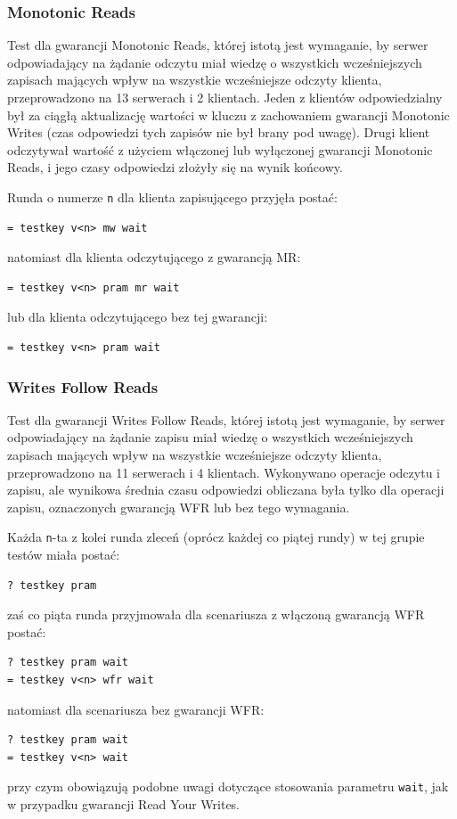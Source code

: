 \subsubsection*{Monotonic Reads}

Test dla gwarancji Monotonic Reads, której istotą jest wymaganie, by serwer odpowiadający na żądanie odczytu miał wiedzę o wszystkich wcześniejszych zapisach mających wpływ na wszystkie wcześniejsze odczyty klienta, przeprowadzono na 13 serwerach i 2 klientach. Jeden z klientów odpowiedzialny był za ciągłą aktualizację wartości w kluczu z zachowaniem gwarancji Monotonic Writes (czas odpowiedzi tych zapisów nie był brany pod uwagę). Drugi klient odczytywał wartość z użyciem włączonej lub wyłączonej gwarancji Monotonic Reads, i jego czasy odpowiedzi złożyły się na wynik końcowy.

Runda o numerze \texttt{n} dla klienta zapisującego przyjęła postać:
\begin{lstlisting}
= testkey v<n> mw wait
\end{lstlisting}
natomiast dla klienta odczytującego z gwarancją MR:
\begin{lstlisting}
= testkey v<n> pram mr wait
\end{lstlisting}
lub dla klienta odczytującego bez tej gwarancji:
\begin{lstlisting}
= testkey v<n> pram wait
\end{lstlisting}

\subsubsection*{Writes Follow Reads}

Test dla gwarancji Writes Follow Reads, której istotą jest wymaganie, by serwer odpowiadający na żądanie zapisu miał wiedzę o wszystkich wcześniejszych zapisach mających wpływ na wszystkie wcześniejsze odczyty klienta, przeprowadzono na 11 serwerach i 4 klientach. Wykonywano operacje odczytu i zapisu, ale wynikowa średnia czasu odpowiedzi obliczana była tylko dla operacji zapisu, oznaczonych gwarancją WFR lub bez tego wymagania.

Każda \texttt{n}-ta z kolei runda zleceń (oprócz każdej co piątej rundy) w tej grupie testów miała postać:
\begin{lstlisting}
? testkey pram
\end{lstlisting}
zaś co piąta runda przyjmowała dla scenariusza z włączoną gwarancją WFR postać:
\begin{lstlisting}
? testkey pram wait
= testkey v<n> wfr wait
\end{lstlisting}
natomiast dla scenariusza bez gwarancji WFR:
\begin{lstlisting}
? testkey pram wait
= testkey v<n> wait
\end{lstlisting}
przy czym obowiązują podobne uwagi dotyczące stosowania parametru \texttt{wait}, jak w przypadku gwarancji Read Your Writes.

